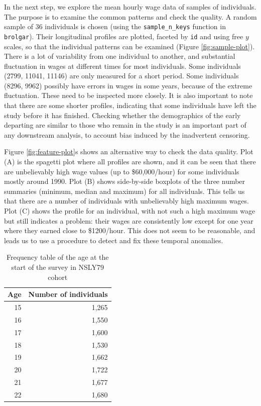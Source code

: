 \documentclass{article}
\begin{document}
In the next step, we explore the mean hourly wage data of samples of individuals. The purpose is to examine the common patterns and check the quality. A random sample of 36 individuals is chosen (using the \texttt{sample\_n\_keys} function in \texttt{brolgar}). Their longitudinal profiles are plotted, faceted by \texttt{id} and using free \(y\) scales, so that the individual patterns can be examined (Figure \ref{fig:sample-plot}). There is a lot of variability from one individual to another, and substantial fluctuation in wages at different times for most individuals. Some individuals (2799, 11041, 11146) are only measured for a short period. Some individuals (8296, 9962) possibly have errors in wages in some years, because of the extreme fluctuation. These need to be inspected more closely. It is also important to note that there are some shorter profiles, indicating that some individuals have left the study before it has finished. Checking whether the demographics of the early departing are similar to those who remain in the study is an important part of any downstream analysis, to account bias induced by the inadvertent censoring.

Figure \ref{fig:feature-plot}s shows an alternative way to check the data quality. Plot (A) is the spagetti plot where all profiles are shown, and it can be seen that there are unbelievably high wage values (up to \$60,000/hour) for some individuals mostly around 1990. Plot (B) shows side-by-side boxplots of the three number summaries (minimum, median and maximum) for all individuals. This tells us that there are a number of individuals with unbelievably high maximum wages. Plot (C) shows the profile for an individual, with not such a high maximum wage but still indicates a problem: their wages are consistently low except for one year where they earned close to \$1200/hour. This does not seem to be reasonable, and leads us to use a procedure to detect and fix these temporal anomalies.

\begin{table}

\caption{\label{tab:age-table}Frequency table of the age at the start of the survey in NSLY79 cohort}
\centering
\begin{tabular}[t]{rr}
\toprule
Age & Number of individuals\\
\midrule
15 & 1,265\\
16 & 1,550\\
17 & 1,600\\
18 & 1,530\\
19 & 1,662\\
20 & 1,722\\
21 & 1,677\\
22 & 1,680\\
\bottomrule
\end{tabular}
\end{table}
\end{document}
